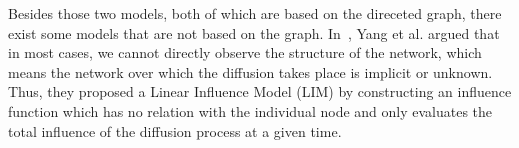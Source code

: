 Besides those two models, both of which are based on the direceted graph, there exist some models that are not based on the graph. In~\cite{yang2010modeling}, Yang et al. argued that in most cases, we cannot directly observe the structure of the network, which means the network over which the diffusion takes place is implicit or unknown. Thus, they proposed a Linear Influence Model (LIM) by constructing an influence function which has no relation with the individual node and only evaluates the total influence of the diffusion process at a given time.   
